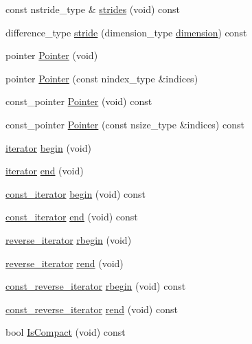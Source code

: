 \begin{DoxyCompactItemize}
\item 
const nstride\-\_\-type \& \hyperlink{classvct_dynamic_n_array_ref_owner_ac7334601eafc3a0ec9d7801ade2fbf6f}{strides} (void) const 
\item 
difference\-\_\-type \hyperlink{classvct_dynamic_n_array_ref_owner_aea8601ea64fa3efad1cb5deee56e46ab}{stride} (dimension\-\_\-type \hyperlink{classvct_dynamic_n_array_ref_owner_ade9ee32661cd3ff7408e93b15ba7e1db}{dimension}) const 
\item 
pointer \hyperlink{classvct_dynamic_n_array_ref_owner_a24bf06f05b30a06407ac8399c6581373}{Pointer} (void)
\item 
pointer \hyperlink{classvct_dynamic_n_array_ref_owner_ab29a02a5fc944eea7205ca6742d8d456}{Pointer} (const nindex\-\_\-type \&indices)
\item 
const\-\_\-pointer \hyperlink{classvct_dynamic_n_array_ref_owner_a18ab69a03de4c71cc0b8a314797fd301}{Pointer} (void) const 
\item 
const\-\_\-pointer \hyperlink{classvct_dynamic_n_array_ref_owner_a2bf84bf6df81ab8c7fafc37668116582}{Pointer} (const nsize\-\_\-type \&indices) const 
\item 
\hyperlink{classvct_dynamic_n_array_ref_owner_a9d68370074a5320a30354e700207ad71}{iterator} \hyperlink{classvct_dynamic_n_array_ref_owner_a6756bce7cfa74acc5bf89a12351a2766}{begin} (void)
\item 
\hyperlink{classvct_dynamic_n_array_ref_owner_a9d68370074a5320a30354e700207ad71}{iterator} \hyperlink{classvct_dynamic_n_array_ref_owner_aaa6cdbf243193da807e44199fc91624d}{end} (void)
\item 
\hyperlink{classvct_dynamic_n_array_ref_owner_ab6652472746656a9be2de178295fd80b}{const\-\_\-iterator} \hyperlink{classvct_dynamic_n_array_ref_owner_a11a054a371e6b27ef7cd63ef7db43ae5}{begin} (void) const 
\item 
\hyperlink{classvct_dynamic_n_array_ref_owner_ab6652472746656a9be2de178295fd80b}{const\-\_\-iterator} \hyperlink{classvct_dynamic_n_array_ref_owner_affef349371877a21b3f8fc6525d6cf71}{end} (void) const 
\item 
\hyperlink{classvct_dynamic_n_array_ref_owner_aabd87b1efc3a18043c6dac3d8017be59}{reverse\-\_\-iterator} \hyperlink{classvct_dynamic_n_array_ref_owner_a835e4e3ea11e7379cfe19cbb44acce8a}{rbegin} (void)
\item 
\hyperlink{classvct_dynamic_n_array_ref_owner_aabd87b1efc3a18043c6dac3d8017be59}{reverse\-\_\-iterator} \hyperlink{classvct_dynamic_n_array_ref_owner_ab55db300eee83a3cf69be606eedb5374}{rend} (void)
\item 
\hyperlink{classvct_dynamic_n_array_ref_owner_ade444e0883b2420a8a113171b6e49bf4}{const\-\_\-reverse\-\_\-iterator} \hyperlink{classvct_dynamic_n_array_ref_owner_a6b60d7fa73fb67fb9af7af6c46217361}{rbegin} (void) const 
\item 
\hyperlink{classvct_dynamic_n_array_ref_owner_ade444e0883b2420a8a113171b6e49bf4}{const\-\_\-reverse\-\_\-iterator} \hyperlink{classvct_dynamic_n_array_ref_owner_ae639994097947c479cd12ac4e44d3450}{rend} (void) const 
\item 
bool \hyperlink{classvct_dynamic_n_array_ref_owner_a0077d4530e6c48c2fbdcd5994dc808d0}{Is\-Compact} (void) const 
\end{DoxyCompactItemize}

